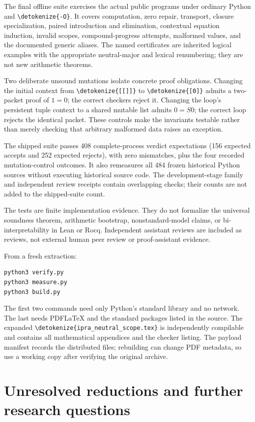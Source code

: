 \documentclass[11pt,letterpaper]{article}
\theoremstyle{definition}\newtheorem{definition}[theorem]{Definition}
\theoremstyle{remark}\newtheorem{remark}[theorem]{Remark}
\newcommand{\file}[1]{\expandafter\nolinkurl\expandafter{\detokenize{#1}}}
\begin{document}
The final offline suite exercises the actual public programs under ordinary
Python and \file{-O}. It covers computation, zero repair, transport, closure
specialization, paired introduction and elimination, contextual equation
induction, invalid scopes, compound-progress attempts, malformed values,
and the documented generic aliases. The named certificates are inherited
logical examples with the appropriate neutral-major and lexical renumbering;
they are not new arithmetic theorems.

Two deliberate unsound mutations isolate concrete proof obligations.
Changing the initial context from \file{[[]]} to \file{[0]} admits a two-packet
proof of $1=0$; the correct checkers reject it. Changing the loop's persistent
tuple context to a shared mutable list admits $0=S0$; the correct loop rejects
the identical packet. These controls make the invariants testable rather than
merely checking that arbitrary malformed data raises an exception.

The shipped suite passes 408 complete-process verdict expectations (156 expected accepts and 252 expected rejects), with zero mismatches, plus the four recorded mutation-control outcomes. It also remeasures all 484 frozen historical Python sources without executing historical source code. The development-stage family and independent review receipts contain overlapping checks; their counts are not added to the shipped-suite count.


The tests are finite implementation evidence. They do not formalize the
universal soundness theorem, arithmetic bootstrap, nonstandard-model claims,
or bi-interpretability in Lean or Rocq. Independent assistant reviews are
included as reviews, not external human peer review or proof-assistant evidence.

From a fresh extraction:
\begin{lstlisting}
python3 verify.py
python3 measure.py
python3 build.py
\end{lstlisting}
The first two commands need only Python's standard library and no network.
The last needs PDFLaTeX and the standard packages listed in the source. The
expanded \file{ipra_neutral_scope.tex} is independently compilable and contains
all mathematical appendices and the checker listing. The payload manifest
records the distributed files; rebuilding can change PDF metadata, so use a
working copy after verifying the original archive.

\section{Unresolved reductions and further research questions}
\end{document}
